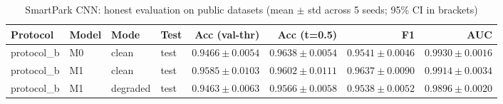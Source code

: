 \begin{table}[t]
\centering
\caption{SmartPark CNN: honest evaluation on public datasets (mean $\pm$ std across 5 seeds; 95\% CI in brackets)}
\label{tab:results}
\begin{tabular}{llllrrrr}
\toprule
Protocol & Model & Mode & Test & Acc (val-thr) & Acc (t=0.5) & F1 & AUC \\
\midrule
protocol_b & M0 & clean & test & $0.9466\pm0.0054$ & $0.9638\pm0.0054$ & $0.9541\pm0.0046$ & $0.9930\pm0.0016$ \\
protocol_b & M1 & clean & test & $0.9585\pm0.0103$ & $0.9602\pm0.0111$ & $0.9637\pm0.0090$ & $0.9914\pm0.0034$ \\
protocol_b & M1 & degraded & test & $0.9463\pm0.0063$ & $0.9566\pm0.0058$ & $0.9538\pm0.0052$ & $0.9896\pm0.0020$ \\
\bottomrule
\end{tabular}
\end{table}